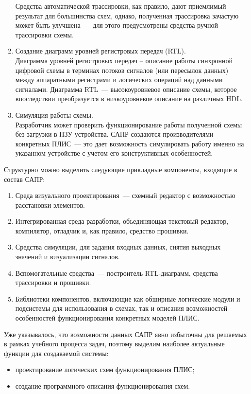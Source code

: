 \begin{enumerate}
  Средства автоматической трассировки, как правило, дают приемлимый результат для большинства схем, однако, полученная трассировка зачастую может быть улучшена~--- для этого предусмотрены средства ручной трассировки схемы.
  \item Создание диаграмм уровней регистровых передач (RTL).\\
  Диаграмма уровней регистровых передач -- описание работы синхронной цифровой схемы в терминах потоков сигналов (или пересылок данных) между аппаратными регистрами и логических операций над данными сигналами.
  Диаграмма RTL~--- высокоуровневое описание схемы, которое впоследствии преобразуется в низкоуровневое описание на различных HDL.
  \item Симуляция работы схемы.\\
  Разработчик может проверить функционирование работы полученной схемы без загрузки в ПЗУ устройства.
  САПР создаются производителями конкретных ПЛИС~--- это дает возможность симулировать работу именно на указанном устройстве с учетом его конструктивных особенностей.
\end{enumerate}

Структурно можно выделить следующие прикладные компоненты, входящие в состав САПР:
\begin{enumerate}
  \item Среда визуального проектирования~--- схемный редактор с возможностью расстановки элементов.
  \item Интегрированная среда разработки, объединяющая текстовый редактор, компилятор, отладчик и, как правило, средство прошивки.
  \item Средства симуляции, для задания входных данных, снятия выходных значений и визуализации сигналов.
  \item Вспомогательные средства~--- построитель RTL-диаграмм, средства трассировки и прошивки.
  \item Библиотеки компонентов, включающие как обширные логические модули и подсистемы для использования в схемах, так и описания возможностей особенностей функционирования конкретных моделей ПЛИС.
\end{enumerate}

Уже указывалось, что возможности данных САПР явно избыточны для решаемых в рамках учебного процесса задач, поэтому выделим наиболее актуальные функции для создаваемой системы:
\begin{itemize}
  \item проектирование логических схем функционирования ПЛИС;
  \item создание программного описания функционирования схем.
\end{itemize}

